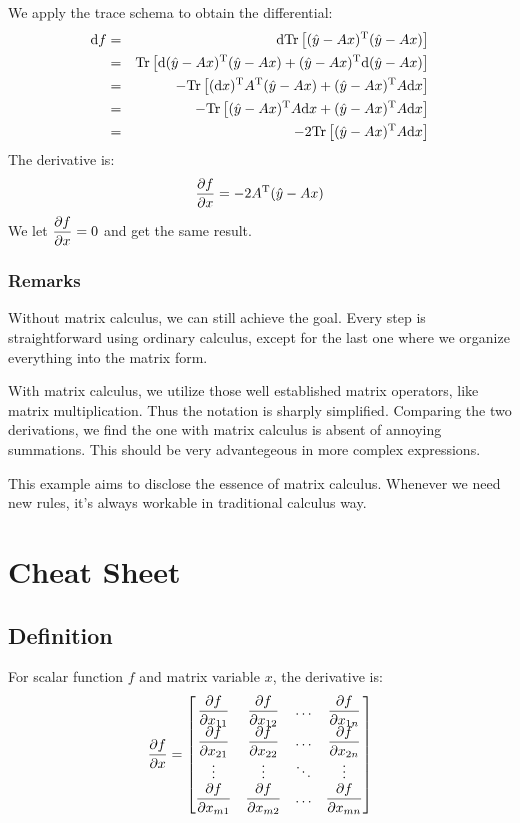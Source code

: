 We apply the trace schema to obtain the differential:
\begin{eqnarray}
	\mathrm{d}f 
	&=& \mathrm{d}\mathrm{Tr}\left[ (\hat{y} - Ax)^\mathrm{T}(\hat{y} - Ax) \right] \\
	&=& \mathrm{Tr}\left[ \mathrm{d}(\hat{y} - Ax)^\mathrm{T}(\hat{y} - Ax)
		+ (\hat{y} - Ax)^\mathrm{T} \mathrm{d}(\hat{y} - Ax) \right] \\
	&=& - \mathrm{Tr}\left[ (\mathrm{d}x)^\mathrm{T} A^\mathrm{T} (\hat{y} - Ax)
		+ (\hat{y} - Ax)^\mathrm{T} A \mathrm{d}x\right] \\
	&=& - \mathrm{Tr}\left[ (\hat{y} - Ax)^\mathrm{T} A \mathrm{d}x
		+ (\hat{y} - Ax)^\mathrm{T} A \mathrm{d}x\right] \\
	&=& -2 \mathrm{Tr}\left[ (\hat{y} - Ax)^\mathrm{T} A \mathrm{d}x\right] 
\end{eqnarray}
The derivative is:
\begin{equation}
	\dfrac{\partial f}{\partial x} = -2 A^\mathrm{T}(\hat{y} - Ax)
\end{equation}
We let $\dfrac{\partial f}{\partial x}=0$ and get the same result. 

\subsubsection{Remarks}

Without matrix calculus, we can still achieve the 
goal. Every step is straightforward using ordinary 
calculus, except for the last one where we organize 
everything into the matrix form. 

With matrix calculus, we utilize those well established 
matrix operators, like matrix multiplication. Thus
the notation is sharply simplified. Comparing the two 
derivations, we find the one with matrix calculus 
is absent of annoying summations. This should be very 
advantegeous in more complex expressions. 

This example aims to disclose the essence of matrix calculus.
Whenever we need new rules, it's always workable in 
traditional calculus way. 


\pagebreak
\section{Cheat Sheet}
\label{sec:cheat}

\subsection{Definition}

For scalar function $f$ and matrix variable $x$, the derivative is:
	\begin{equation}
		\dfrac{\partial f}{\partial x} = 
		\left[
		\begin{matrix}
			\dfrac{\partial f}{\partial x_{11}} & \dfrac{\partial f}{\partial x_{12}} & \ldots &\dfrac{\partial f}{\partial x_{1n}}\\
			\dfrac{\partial f}{\partial x_{21}} & \dfrac{\partial f}{\partial x_{22}} & \ldots &\dfrac{\partial f}{\partial x_{2n}}\\
			\vdots & \vdots & \ddots & \vdots \\
			\dfrac{\partial f}{\partial x_{m1}} & \dfrac{\partial f}{\partial x_{m2}} & \ldots &\dfrac{\partial f}{\partial x_{mn}}\\
		\end{matrix}
		\right]
	\end{equation}

